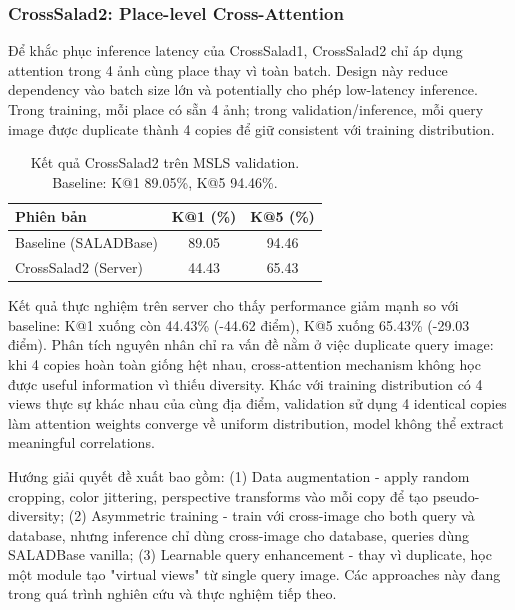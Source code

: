 \documentclass[12pt,a4paper]{article}
\begin{document}
    \subsubsection{CrossSalad2: Place-level Cross-Attention}

    Để khắc phục inference latency của CrossSalad1, CrossSalad2 chỉ áp dụng attention trong 4 ảnh cùng place thay vì toàn batch. Design này reduce dependency vào batch size lớn và potentially cho phép low-latency inference. Trong training, mỗi place có sẵn 4 ảnh; trong validation/inference, mỗi query image được duplicate thành 4 copies để giữ consistent với training distribution.

    \begin{table}[h]
    \centering
    \caption{Kết quả CrossSalad2 trên MSLS validation. Baseline: K@1 89.05\%, K@5 94.46\%.}
    \label{tab:crosssalad2_results}
    \small
    \begin{tabular}{@{}lcc@{}}
    \toprule
    \textbf{Phiên bản} & \textbf{K@1 (\%)} & \textbf{K@5 (\%)} \\
    \midrule
    Baseline (SALADBase) & 89.05 & 94.46 \\
    CrossSalad2 (Server) & 44.43 & 65.43 \\
    \bottomrule
    \end{tabular}
    \end{table}

    Kết quả thực nghiệm trên server cho thấy performance giảm mạnh so với baseline: K@1 xuống còn 44.43\% (-44.62 điểm), K@5 xuống 65.43\% (-29.03 điểm). Phân tích nguyên nhân chỉ ra vấn đề nằm ở việc duplicate query image: khi 4 copies hoàn toàn giống hệt nhau, cross-attention mechanism không học được useful information vì thiếu diversity. Khác với training distribution có 4 views thực sự khác nhau của cùng địa điểm, validation sử dụng 4 identical copies làm attention weights converge về uniform distribution, model không thể extract meaningful correlations.

    Hướng giải quyết đề xuất bao gồm: (1) Data augmentation - apply random cropping, color jittering, perspective transforms vào mỗi copy để tạo pseudo-diversity; (2) Asymmetric training - train với cross-image cho both query và database, nhưng inference chỉ dùng cross-image cho database, queries dùng SALADBase vanilla; (3) Learnable query enhancement - thay vì duplicate, học một module tạo "virtual views" từ single query image. Các approaches này đang trong quá trình nghiên cứu và thực nghiệm tiếp theo.
\end{document}
